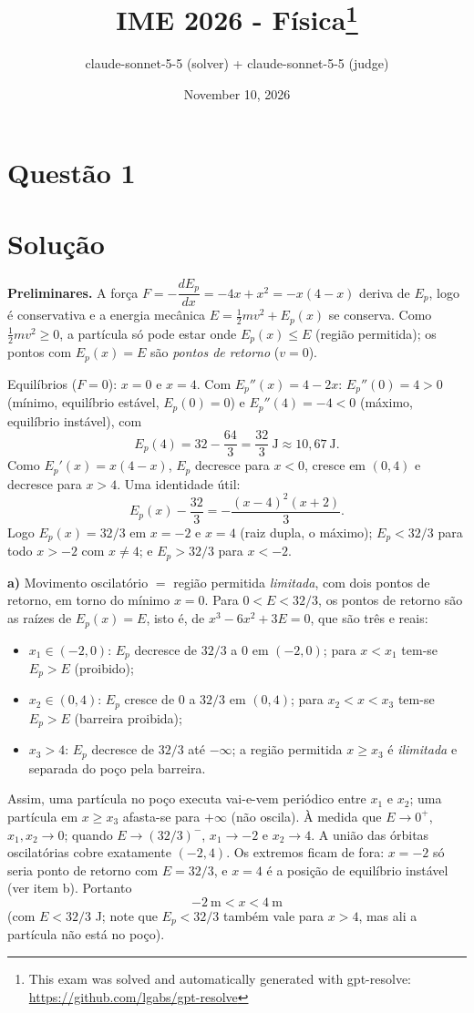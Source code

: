 \documentclass{article}%
\title{IME 2026 - Física\thanks{This exam was solved and automatically generated with gpt-resolve: \url{https://github.com/lgabs/gpt-resolve}}}%
\author{claude{-}sonnet{-}5{-}5 (solver) + claude{-}sonnet{-}5{-}5 (judge)}%
\date{November 10, 2026}%
\begin{document}
%
\normalsize%
\maketitle%
\section*{Questão 1}

\section*{Solução}

\textbf{Preliminares.} A força $F=-\dfrac{dE_p}{dx}=-4x+x^2=-x(4-x)$ deriva de $E_p$, logo é conservativa e a energia mecânica $E=\tfrac12 mv^2+E_p(x)$ se conserva. Como $\tfrac12mv^2\ge 0$, a partícula só pode estar onde $E_p(x)\le E$ (região permitida); os pontos com $E_p(x)=E$ são \emph{pontos de retorno} ($v=0$).

Equilíbrios ($F=0$): $x=0$ e $x=4$. Com $E_p''(x)=4-2x$: $E_p''(0)=4>0$ (mínimo, equilíbrio estável, $E_p(0)=0$) e $E_p''(4)=-4<0$ (máximo, equilíbrio instável), com
\[
E_p(4)=32-\frac{64}{3}=\frac{32}{3}\ \text{J}\approx 10{,}67\ \text{J}.
\]
Como $E_p'(x)=x(4-x)$, $E_p$ decresce para $x<0$, cresce em $(0,4)$ e decresce para $x>4$. Uma identidade útil:
\[
E_p(x)-\frac{32}{3}=-\frac{(x-4)^2(x+2)}{3}.
\]
Logo $E_p(x)=32/3$ em $x=-2$ e $x=4$ (raiz dupla, o máximo); $E_p<32/3$ para todo $x>-2$ com $x\neq4$; e $E_p>32/3$ para $x<-2$.

\textbf{a)} Movimento oscilatório $=$ região permitida \emph{limitada}, com dois pontos de retorno, em torno do mínimo $x=0$. Para $0<E<32/3$, os pontos de retorno são as raízes de $E_p(x)=E$, isto é, de $x^3-6x^2+3E=0$, que são três e reais:
\begin{itemize}
\item $x_1\in(-2,0)$: $E_p$ decresce de $32/3$ a $0$ em $(-2,0)$; para $x<x_1$ tem-se $E_p>E$ (proibido);
\item $x_2\in(0,4)$: $E_p$ cresce de $0$ a $32/3$ em $(0,4)$; para $x_2<x<x_3$ tem-se $E_p>E$ (barreira proibida);
\item $x_3>4$: $E_p$ decresce de $32/3$ até $-\infty$; a região permitida $x\ge x_3$ é \emph{ilimitada} e separada do poço pela barreira.
\end{itemize}
Assim, uma partícula no poço executa vai-e-vem periódico entre $x_1$ e $x_2$; uma partícula em $x\ge x_3$ afasta-se para $+\infty$ (não oscila). À medida que $E\to0^+$, $x_1,x_2\to0$; quando $E\to(32/3)^-$, $x_1\to-2$ e $x_2\to4$. A união das órbitas oscilatórias cobre exatamente $(-2,4)$. Os extremos ficam de fora: $x=-2$ só seria ponto de retorno com $E=32/3$, e $x=4$ é a posição de equilíbrio instável (ver item b). Portanto
\[
\boxed{-2\ \text{m}<x<4\ \text{m}}
\]
(com $E<32/3$ J; note que $E_p<32/3$ também vale para $x>4$, mas ali a partícula não está no poço).
\end{document}
